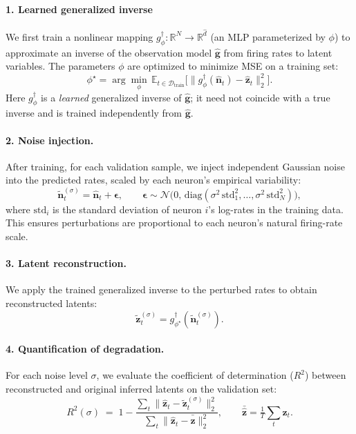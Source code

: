 \documentclass{article}
\begin{document}
\paragraph{1. Learned generalized inverse}
We first train a nonlinear mapping $g^\dagger_\phi: \mathbb{R}^N \to \mathbb{R}^{\hat{d}}$ (an MLP parameterized by $\phi$) to approximate an inverse of the observation model $\mathbf{\hat{g}}$ from firing rates to latent variables. The parameters $\phi$ are optimized to minimize MSE on a training set:
\[
\phi^\star = \arg\min_\phi \, \mathbb{E}_{t \in \mathcal{D}_{\mathrm{train}}}
\Big[ \lVert g^\dagger_\phi(\hat{\mathbf{n}}_t) - \hat{\mathbf{z}}_t \rVert_2^2 \Big].
\]
Here $g^\dagger_\phi$ is a \emph{learned} generalized inverse of $\mathbf{\hat{g}}$; it need not coincide with a true inverse and is trained independently from $\mathbf{\hat{g}}$.

\paragraph{2. Noise injection.}
After training, for each validation sample, we inject independent Gaussian noise into the predicted rates, scaled by each neuron's empirical variability:
\[
\tilde{\mathbf{n}}_t^{(\sigma)} = \hat{\mathbf{n}}_t + \boldsymbol{\epsilon}, \qquad
\boldsymbol{\epsilon} \sim \mathcal{N}\!\big(0, \, \mathrm{diag}(\sigma^2 \, \mathrm{std}_1^2, \ldots, \sigma^2 \, \mathrm{std}_N^2)\big),
\]
where $\mathrm{std}_i$ is the standard deviation of neuron $i$'s log-rates in the training data. This ensures perturbations are proportional to each neuron's natural firing-rate scale.

\paragraph{3. Latent reconstruction.}
We apply the trained generalized inverse to the perturbed rates to obtain reconstructed latents:
\[
\tilde{\mathbf{z}}_t^{(\sigma)} = g^\dagger_{\phi^\star}(\tilde{\mathbf{n}}_t^{(\sigma)}).
\]

\paragraph{4. Quantification of degradation.}
For each noise level $\sigma$, we evaluate the coefficient of determination ($R^2$) between reconstructed and original inferred latents on the validation set:
\[
R^2(\sigma) \;=\; 1 - \frac{\sum_t \lVert \hat{\mathbf{z}}_t - \tilde{\mathbf{z}}_t^{(\sigma)} \rVert_2^2}{\sum_t \lVert \hat{\mathbf{z}}_t - \bar{\hat{\mathbf{z}}} \rVert_2^2},
\qquad
\bar{\hat{\mathbf{z}}} = \tfrac{1}{T} \sum_t \hat{\mathbf{z}}_t.
\]
\end{document}
